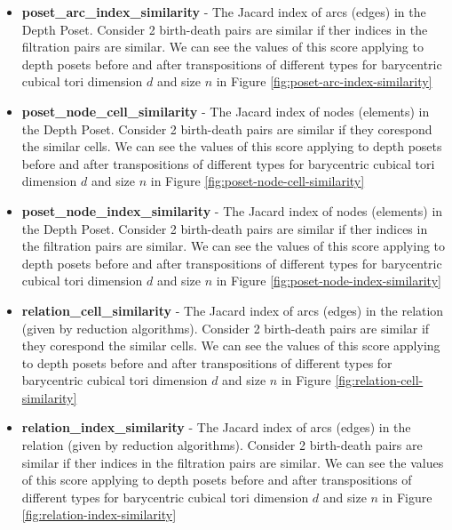 \documentclass{article}
\begin{document}
\begin{itemize}
\item \textbf{poset\_arc\_index\_similarity} - The Jacard index of arcs (edges) in the Depth Poset.
    Consider 2 birth-death pairs are similar if ther indices in the filtration pairs are similar.
We can see the values of this score applying to depth posets before and after transpositions of different types for barycentric cubical tori dimension $d$ and size $n$ in Figure \ref{fig:poset-arc-index-similarity}
\item \textbf{poset\_node\_cell\_similarity} - The Jacard index of nodes (elements) in the Depth Poset.
    Consider 2 birth-death pairs are similar if they corespond the similar cells.
We can see the values of this score applying to depth posets before and after transpositions of different types for barycentric cubical tori dimension $d$ and size $n$ in Figure \ref{fig:poset-node-cell-similarity}
\item \textbf{poset\_node\_index\_similarity} - The Jacard index of nodes (elements) in the Depth Poset.
    Consider 2 birth-death pairs are similar if ther indices in the filtration pairs are similar.
We can see the values of this score applying to depth posets before and after transpositions of different types for barycentric cubical tori dimension $d$ and size $n$ in Figure \ref{fig:poset-node-index-similarity}
\item \textbf{relation\_cell\_similarity} - The Jacard index of arcs (edges) in the relation (given by reduction algorithms).
    Consider 2 birth-death pairs are similar if they corespond the similar cells.
We can see the values of this score applying to depth posets before and after transpositions of different types for barycentric cubical tori dimension $d$ and size $n$ in Figure \ref{fig:relation-cell-similarity}
\item \textbf{relation\_index\_similarity} - The Jacard index of arcs (edges) in the relation (given by reduction algorithms).
    Consider 2 birth-death pairs are similar if ther indices in the filtration pairs are similar.
We can see the values of this score applying to depth posets before and after transpositions of different types for barycentric cubical tori dimension $d$ and size $n$ in Figure \ref{fig:relation-index-similarity}
\end{itemize}
\end{document}

